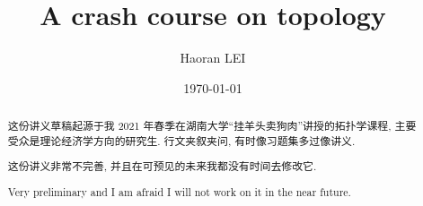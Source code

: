 \documentclass[12pt]{article}
\theoremstyle{definition}
\theoremstyle{remark}
\begin{document}
\title{A crash course on topology}
\author{Haoran LEI}  
\date{\today}

\maketitle

\begin{CJK}{UTF8}{gkai}
   

\begin{abstract}

  这份讲义草稿起源于我 2021 年春季在湖南大学``挂羊头卖狗肉''讲授的拓扑学课程, 主要受众是理论经济学方向的研究生.
  行文夹叙夹问, 有时像习题集多过像讲义.  

  这份讲义非常不完善, 并且在可预见的未来我都没有时间去修改它. 

  Very preliminary and I am afraid I will not work on it in the near future.
   
\end{abstract}

\end{CJK}

\clearpage

\clearpage



\clearpage



\clearpage

\end{document}
